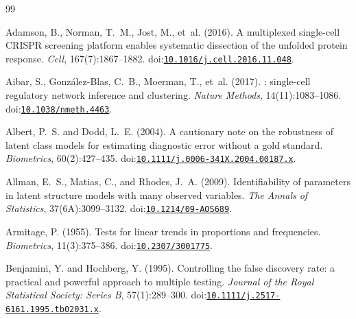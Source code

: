 \documentclass[11pt,a4paper]{article}
\providecommand{\DIFaddbegin}{} %
\providecommand{\DIFdelend}{} %
\newcommand{\DIFaddincludegraphics}[2][]{{\color{blue}\fbox{\DIFOincludegraphics[#1]{#2}}}} %
\DeclareRobustCommand{\DIFaddbegin}{\DIFOaddbegin \let\includegraphics\DIFaddincludegraphics} %
\DeclareRobustCommand{\DIFdelend}{\DIFOaddend \let\includegraphics\DIFOincludegraphics} %
\begin{document}

\DIFdelend \DIFaddbegin \begin{thebibliography}{99}

Adamson, B., Norman, T.~M., Jost, M., et~al. (2016).
\newblock A multiplexed single-cell {CRISPR} screening platform enables systematic dissection of the unfolded protein response.
\newblock \emph{Cell}, 167(7):1867--1882.
\newblock doi:\href{https://doi.org/10.1016/j.cell.2016.11.048}{\nolinkurl{10.1016/j.cell.2016.11.048}}.

Aibar, S., Gonz{\'a}lez-Blas, C.~B., Moerman, T., et~al. (2017).
: single-cell regulatory network inference and clustering.
\newblock \emph{Nature Methods}, 14(11):1083--1086.
\newblock doi:\href{https://doi.org/10.1038/nmeth.4463}{\nolinkurl{10.1038/nmeth.4463}}.

Albert, P.~S. and Dodd, L.~E. (2004).
\newblock A cautionary note on the robustness of latent class models for estimating diagnostic error without a gold standard.
\newblock \emph{Biometrics}, 60(2):427--435.
\newblock doi:\href{https://doi.org/10.1111/j.0006-341X.2004.00187.x}{\nolinkurl{10.1111/j.0006-341X.2004.00187.x}}.

Allman, E.~S., Matias, C., and Rhodes, J.~A. (2009).
\newblock Identifiability of parameters in latent structure models with many observed variables.
\newblock \emph{The Annals of Statistics}, 37(6A):3099--3132.
\newblock doi:\href{https://doi.org/10.1214/09-AOS689}{\nolinkurl{10.1214/09-AOS689}}.

Armitage, P. (1955).
\newblock Tests for linear trends in proportions and frequencies.
\newblock \emph{Biometrics}, 11(3):375--386.
\newblock doi:\href{https://doi.org/10.2307/3001775}{\nolinkurl{10.2307/3001775}}.

Benjamini, Y. and Hochberg, Y. (1995).
\newblock Controlling the false discovery rate: a practical and powerful approach to multiple testing.
\newblock \emph{Journal of the Royal Statistical Society: Series B}, 57(1):289--300.
\newblock doi:\href{https://doi.org/10.1111/j.2517-6161.1995.tb02031.x}{\nolinkurl{10.1111/j.2517-6161.1995.tb02031.x}}.


\end{thebibliography}
\end{document}

